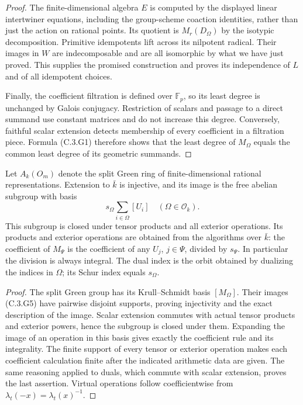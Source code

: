 \begin{proof}
The finite-dimensional algebra $E$ is computed by the displayed
linear intertwiner equations, including the group-scheme coaction
identities, rather than just the action on rational points.
Its quotient is $M_r(D_\Omega)$ by the isotypic decomposition.
Primitive idempotents lift across its nilpotent radical.
Their images in $W$ are indecomposable and are all isomorphic
by what we have just proved. This supplies the promised
construction and proves its independence of $L$ and of all
idempotent choices.

Finally, the coefficient filtration is defined over $\mathbb F_p$,
so its least degree is unchanged by Galois conjugacy. Restriction
of scalars and passage to a direct summand use constant matrices
and do not increase this degree. Conversely, faithful scalar
extension detects membership of every coefficient in a filtration
piece. Formula (C.3.G1) therefore shows that the least degree of
$M_\Omega$ equals the common least degree of its geometric summands.
\end{proof}

\begin{corollary}
\label{C:perfect_Green_image}
Let $A_k(O_m)$ denote the split Green ring of finite-dimensional
rational representations. Extension to $\bar k$ is injective,
and its image is the free abelian subgroup with basis
\[
                s_\Omega\sum_{i\in\Omega}[U_i]
                        \quad(\Omega\in\mathscr O_k).
                                                        \tag{C.3.G5}
\]
This subgroup is closed under tensor products and all exterior
operations. Its products and exterior operations are obtained
from the algorithms over $\bar k$: the coefficient of $M_\Psi$
is the coefficient of any $U_j$, $j\in\Psi$, divided by
$s_\Psi$. In particular the division is always integral.
The dual index is the orbit obtained by dualizing the indices
in $\Omega$; its Schur index equals $s_\Omega$.
\end{corollary}
\begin{proof}
The split Green group has its Krull--Schmidt basis
$[M_\Omega]$. Their images (C.3.G5) have pairwise disjoint
supports, proving injectivity and the exact description of the
image. Scalar extension commutes with actual tensor products
and exterior powers, hence the subgroup is closed under them.
Expanding the image of an operation in this basis gives exactly
the coefficient rule and its integrality. The finite support
of every tensor or exterior operation makes each coefficient
calculation finite after the indicated arithmetic data are given.
The same reasoning applied to duals, which commute with scalar
extension, proves the last assertion. Virtual operations follow
coefficientwise from $\lambda_t(-x)=\lambda_t(x)^{-1}$.
\end{proof}

